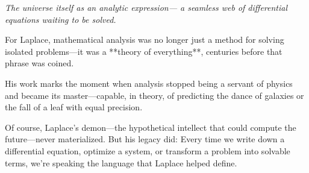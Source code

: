 \begin{center}
\textit{The universe itself as an analytic expression—  
a seamless web of differential equations waiting to be solved.}
\end{center}

For Laplace, mathematical analysis was no longer just a method for solving isolated problems—it was a **theory of everything**, centuries before that phrase was coined.

\vspace{1em}

His work marks the moment when analysis stopped being a servant of physics and became its master—capable, in theory, of predicting the dance of galaxies or the fall of a leaf with equal precision.

Of course, Laplace’s demon—the hypothetical intellect that could compute the future—never materialized. But his legacy did:  
Every time we write down a differential equation, optimize a system, or transform a problem into solvable terms, we’re speaking the language that Laplace helped define.

